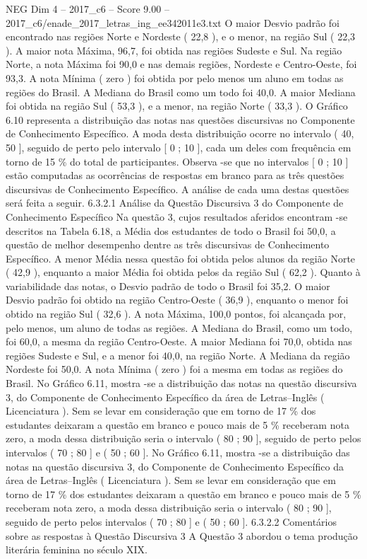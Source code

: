 \begin{textsample}{NEG Dim 4 – 2017\_c6 – Score 9.00 – 2017\_c6/enade\_2017\_letras\_ing\_ee342011e3.txt}
O maior Desvio padrão foi encontrado nas regiões Norte e Nordeste ( 22,8 ), e o menor, na região Sul ( 22,3 ).
A maior nota Máxima, 96,7, foi obtida nas regiões Sudeste e Sul.
Na região Norte, a nota Máxima foi 90,0 e nas demais regiões, Nordeste e Centro-Oeste, foi 93,3.
A nota Mínima ( zero ) foi obtida por pelo menos um aluno em todas as regiões do Brasil.
A Mediana do Brasil como um todo foi 40,0.
A maior Mediana foi obtida na região Sul ( 53,3 ), e a menor, na região Norte ( 33,3 ).
O Gráfico 6.10 representa a distribuição das notas nas questões discursivas no Componente de Conhecimento Específico.
A moda desta distribuição ocorre no intervalo ( 40, 50 ], seguido de perto pelo intervalo [ 0 ; 10 ], cada um deles com frequência em torno de 15 \% do total de participantes.
Observa -se que no intervalos [ 0 ; 10 ] estão computadas as ocorrências de respostas em branco para as três questões discursivas de Conhecimento Específico.
A análise de cada uma destas questões será feita a seguir. 6.3.2.1 Análise da Questão Discursiva 3 do Componente de Conhecimento Específico Na questão 3, cujos resultados aferidos encontram -se descritos na Tabela 6.18, a Média dos estudantes de todo o Brasil foi 50,0, a questão de melhor desempenho dentre as três discursivas de Conhecimento Específico.
A menor Média nessa questão foi obtida pelos alunos da região Norte ( 42,9 ), enquanto a maior Média foi obtida pelos da região Sul ( 62,2 ).
Quanto à variabilidade das notas, o Desvio padrão de todo o Brasil foi 35,2.
O maior Desvio padrão foi obtido na região Centro-Oeste ( 36,9 ), enquanto o menor foi obtido na região Sul ( 32,6 ).
A nota Máxima, 100,0 pontos, foi alcançada por, pelo menos, um aluno de todas as regiões.
A Mediana do Brasil, como um todo, foi 60,0, a mesma da região Centro-Oeste.
A maior Mediana foi 70,0, obtida nas regiões Sudeste e Sul, e a menor foi 40,0, na região Norte.
A Mediana da região Nordeste foi 50,0.
A nota Mínima ( zero ) foi a mesma em todas as regiões do Brasil.
No Gráfico 6.11, mostra -se a distribuição das notas na questão discursiva 3, do Componente de Conhecimento Específico da área de Letras–Inglês ( Licenciatura ).
Sem se levar em consideração que em torno de 17 \% dos estudantes deixaram a questão em branco e pouco mais de 5 \% receberam nota zero, a moda dessa distribuição seria o intervalo ( 80 ; 90 ], seguido de perto pelos intervalos ( 70 ; 80 ] e ( 50 ; 60 ].
No Gráfico 6.11, mostra -se a distribuição das notas na questão discursiva 3, do Componente de Conhecimento Específico da área de Letras–Inglês ( Licenciatura ).
Sem se levar em consideração que em torno de 17 \% dos estudantes deixaram a questão em branco e pouco mais de 5 \% receberam nota zero, a moda dessa distribuição seria o intervalo ( 80 ; 90 ], seguido de perto pelos intervalos ( 70 ; 80 ] e ( 50 ; 60 ]. 6.3.2.2 Comentários sobre as respostas à Questão Discursiva 3 A Questão 3 abordou o tema produção literária feminina no século XIX.

\end{textsample}
